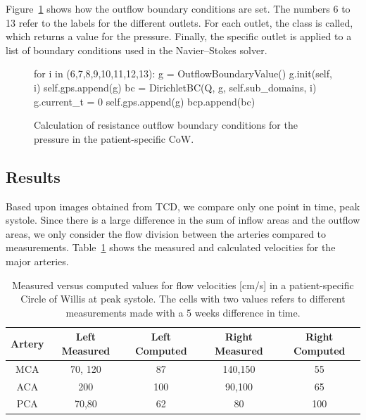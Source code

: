 Figure~\ref{fig:outflow_code} shows how the outflow boundary
conditions are set. The numbers 6 to 13 refer to the labels for the
different outlets. For each outlet, the class
 is called, which returns a value for the
pressure. Finally, the specific outlet is applied to a list of
boundary conditions used in the Navier--Stokes solver.

\begin{figure}
  \codesize
  \begin{center}
    \begin{python}
for i in (6,7,8,9,10,11,12,13):
	g = OutflowBoundaryValue()
	g.init(self, i)
	self.gps.append(g)
	bc = DirichletBC(Q, g, self.sub_domains, i)
	g.current_t = 0
	self.gps.append(g)
	bcp.append(bc)
    \end{python}
    \caption{Calculation of resistance outflow boundary conditions for
      the pressure in the patient-specific CoW.}
    \label{fig:outflow_code}
  \end{center}
\end{figure}

\subsection{Results}

Based upon images obtained from TCD, we compare only one point in
time, peak systole. Since there is a large difference in the sum of
inflow areas and the outflow areas, we only consider the flow division
between the arteries compared to measurements.
Table~\ref{measure_vs_comp} shows the measured and calculated
velocities for the major arteries.

\begin{table}
  \begin{tabular}  {  c | c | c | c | c }
    Artery & Left Measured & Left Computed & Right Measured & Right Computed \\
    \hline
    MCA & 70, 120 		& 87  & 140,150 	& 55	\\
    ACA & 200  		& 100  	& 90,100 	& 65	\\
    PCA & 70,80  		& 62 	& 80  		& 100  \\
    \hline
  \end{tabular}
  \caption{Measured versus computed values for flow velocities [cm/s]
    in a patient-specific Circle of Willis at peak systole. The cells
    with two values refers to different measurements made with a 5
    weeks difference in time.}
  \label{measure_vs_comp}
\end{table}

